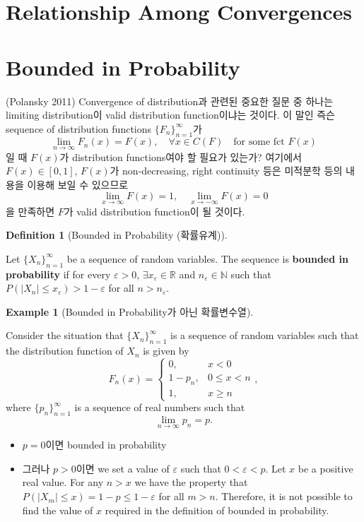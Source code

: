 \documentclass[
  letterpaper,
  DIV=11,
  numbers=noendperiod]{scrreprt}
\theoremstyle{plain}
\theoremstyle{definition}
\newtheorem{example}{Example}[chapter]
\theoremstyle{definition}
\newtheorem{definition}{Definition}[chapter]
\theoremstyle{plain}
\theoremstyle{plain}
\theoremstyle{remark}
\begin{document}
\section{Relationship Among
Convergences}\label{relationship-among-convergences}

\section{Bounded in Probability}\label{bounded-in-probability}

(Polansky 2011) Convergence of distribution과 관련된 중요한 질문 중
하나는 limiting distribution이 valid distribution function이냐는 것이다.
이 말인 즉슨 sequence of distribution functions
\(\{ F_n \}_{n=1}^{\infty}\)가 \[
\lim_{n\rightarrow\infty} F_n (x) = F(x), \quad{} \forall x \in C(F) \quad{} \text{for some fct } F(x)
\] 일 때 \(F(x)\)가 distribution functions여야 할 필요가 있는가?
여기에서 \(F(x) \in [0,1]\), \(F(x)\)가 non-decreasing, right continuity
등은 미적분학 등의 내용을 이용해 보일 수 있으므로 \[
\lim_{x\rightarrow \infty} F(x) = 1, \quad{} \lim_{x\rightarrow -\infty} F(x) = 0
\] 을 만족하면 \(F\)가 valid distribution function이 될 것이다.

\begin{definition}[Bounded in Probability
(확률유계)]\protect\hypertarget{def-bip}{}\label{def-bip}

Let \(\{X_n\}_{n=1}^{\infty}\) be a sequence of random variables. The
sequence is \textbf{bounded in probability} if for every
\(\varepsilon>0\), \(\exists x_{\varepsilon} \in \mathbb{R}\) and
\(n_{\varepsilon} \in \mathbb{N}\) such that
\(P(|X_n| \leq x_{\varepsilon})>1-\varepsilon\) for all
\(n > n_{\varepsilon}\).

\end{definition}

\begin{example}[Bounded in Probability가 아닌
확률변수열]\protect\hypertarget{exm-notbip}{}\label{exm-notbip}

Consider the situation that \(\{X_n\}_{n=1}^{\infty}\) is a sequence of
random variables such that the distribution function of \(X_n\) is given
by \[
F_n(x) =
\begin{cases}
0, & x<0\\
1-p_n, & 0 \leq x < n\\
1, & x\geq n
\end{cases},
\] where \(\{p_n\}_{n=1}^{\infty}\) is a sequence of real numbers such
that \[
\lim_{n\rightarrow \infty} p_n = p.
\]

\begin{itemize}
\item
  \(p=0\)이면 bounded in probability
\item
  그러나 \(p>0\)이면 we set a value of \(\varepsilon\) such that
  \(0< \varepsilon < p\). Let \(x\) be a positive real value. For any
  \(n>x\) we have the property that
  \(P(|X_m|\leq x) = 1-p \leq 1- \varepsilon\) for all \(m>n\).
  Therefore, it is not possible to find the value of \(x\) required in
  the definition of bounded in probability.
\end{itemize}

\end{example}
\end{document}
